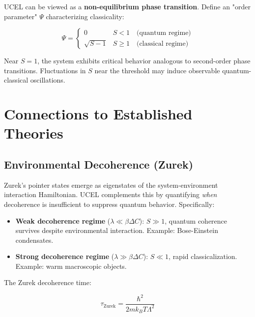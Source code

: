 \documentclass[12pt,a4paper]{article}
\begin{document}
UCEL can be viewed as a \textbf{non-equilibrium phase transition}. Define an "order parameter" $\Psi$ characterizing classicality:

\begin{equation}
\Psi = \begin{cases}
0 & S < 1 \quad \text{(quantum regime)} \\
\sqrt{S - 1} & S \geq 1 \quad \text{(classical regime)}
\end{cases}
\label{eq:order_parameter}
\end{equation}

Near $S = 1$, the system exhibits critical behavior analogous to second-order phase transitions. Fluctuations in $S$ near the threshold may induce observable quantum-classical oscillations.

\section{Connections to Established Theories}
\label{sec:connections}

\subsection{Environmental Decoherence (Zurek)}

Zurek's pointer states \citep{zurek2003} emerge as eigenstates of the system-environment interaction Hamiltonian. UCEL complements this by quantifying \emph{when} decoherence is insufficient to suppress quantum behavior. Specifically:

\begin{itemize}
    \item \textbf{Weak decoherence regime} ($\lambda \ll \beta \Delta C$): $S \gg 1$, quantum coherence survives despite environmental interaction. Example: Bose-Einstein condensates.
    \item \textbf{Strong decoherence regime} ($\lambda \gg \beta \Delta C$): $S \ll 1$, rapid classicalization. Example: warm macroscopic objects.
\end{itemize}

The Zurek decoherence time:

\begin{equation}
\tau_{\text{Zurek}} = \frac{\hbar^2}{2 m k_B T \Lambda^2}
\label{eq:zurek_time}
\end{equation}
\end{document}

